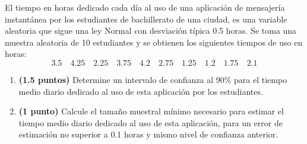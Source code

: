 
El tiempo en horas dedicado cada día al uso de una aplicación de mensajería instantánea por los estudiantes de bachillerato de una ciudad, es una variable aleatoria que sigue una ley Normal con desviación típica 0.5 horas. Se toma una muestra aleatoria de 10 estudiantes y se obtienen los siguientes tiempos de uso en horas:
\[
3.5\quad4.25\quad2.25\quad3.75\quad4.2\quad2.75\quad1.25\quad1.2\quad1.75\quad2.1
\]
\begin{enumerate}[label=\alph*)]
\item \textbf{(1.5 puntos)} Determine un intervalo de confianza al 90\% para el tiempo medio diario dedicado al uso de esta aplicación por los estudiantes.
\item \textbf{(1 punto)} Calcule el tamaño muestral mínimo necesario para estimar el tiempo medio diario dedicado al uso de esta aplicación, para un error de estimación no superior a 0.1 horas y mismo nivel de confianza anterior.
\end{enumerate}
